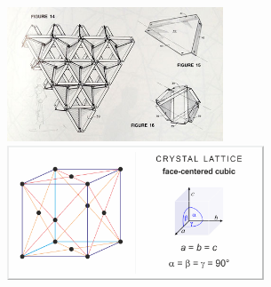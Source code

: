 \documentclass[c, 10pt]{beamer}
\begin{document}
\begin{frame}[plain]


	\begin{center}
			\includegraphics[height = 4cm]{./FigureLayout/truss.jpg}
			\includegraphics[height = 4cm]{./FigureLayout/fcc.png}
	\end{center}


\end{frame}
\end{document}
